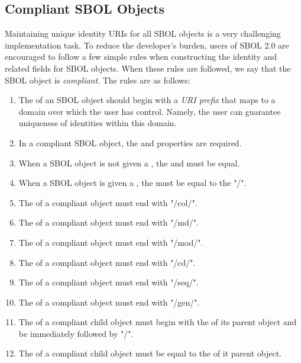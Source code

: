 
\subsection{Compliant SBOL Objects}
\label{sec:compliant}

Maintaining unique identity URIs for all SBOL objects is a very challenging implementation task.  To reduce the developer's burden, users of SBOL 2.0 are encouraged to follow a few simple rules when constructing the identity and related fields for SBOL objects.  When these rules are followed, we say that the SBOL object is \emph{compliant}.  The rules are as follows:
\begin{enumerate}
\item The  of an SBOL object should begin with a \emph{URI prefix} that maps to a domain over which the user has control.  Namely, the user can guarantee uniqueness of identities within this domain.
\item In a compliant SBOL object, the  and  properties are required.
\item When a SBOL object is not given a , the  and  must be equal.
\item When a SBOL object is given a , the  must be equal to the "/".
\item The  of a compliant  object must end with "/col/". 
\item The  of a compliant  object must end with "/md/". 
\item The  of a compliant  object  must end with "/mod/".
\item The  of a compliant  object must end with "/cd/". 
\item The  of a compliant  object must end with "/seq/". 
\item The  of a compliant  object must end with "/gen/". 
\item The  of a compliant child object must begin with the  of its parent object and be immediately followed by "/". 
\item The  of a compliant child object must be equal to the  of it parent object.
\end{enumerate}

